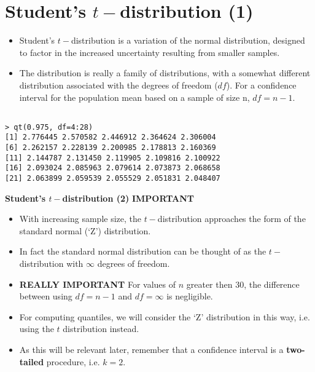 \section{Student's $t-$distribution (1)}
\begin{itemize}
\item Student's $t-$distribution is a variation of the normal distribution, designed to factor in the increased uncertainty resulting from smaller samples.
\item The distribution is really a family of distributions, with
a somewhat different distribution associated with the degrees of freedom ($df$). For a confidence interval for the
population mean based on a sample of size n, $df = n - 1$.

\end{itemize}
\begin{verbatim}

> qt(0.975, df=4:28)
[1] 2.776445 2.570582 2.446912 2.364624 2.306004
[6] 2.262157 2.228139 2.200985 2.178813 2.160369
[11] 2.144787 2.131450 2.119905 2.109816 2.100922
[16] 2.093024 2.085963 2.079614 2.073873 2.068658
[21] 2.063899 2.059539 2.055529 2.051831 2.048407
\end{verbatim}





\textbf{Student's $t-$distribution (2)}
\textbf{IMPORTANT}
\begin{itemize}
\item  With increasing
sample size, the $t-$distribution approaches the form of the standard normal (`Z') distribution.
\item  In fact the standard normal distribution can be thought of as the $t-$distribution with $\infty$ degrees of freedom.

\item  \textbf{REALLY IMPORTANT} For values of $n$ greater then 30, the difference between using $df = n-1$ and $df = \infty$ is negligible.
\item  For computing quantiles, we will consider the `Z' distribution in this way, i.e. using the $t$ distribution instead.
\item  As this will be relevant later, remember that a confidence interval is a \textbf{two-tailed} procedure, i.e. $k=2$.
\end{itemize}



